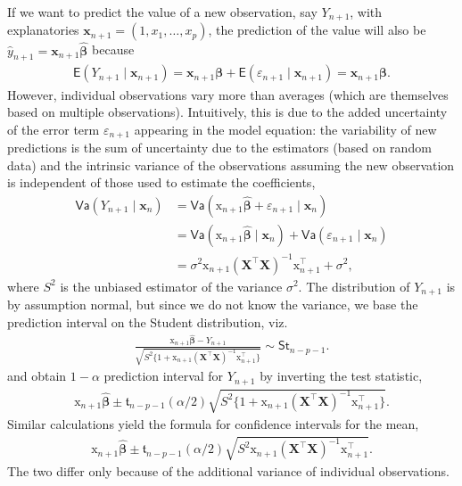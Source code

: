 \documentclass[
  11pt,
  letterpaper,
]{book}
\theoremstyle{definition}
\theoremstyle{definition}
\theoremstyle{definition}
\theoremstyle{definition}
\theoremstyle{remark}
\begin{document}
If we want to predict the value of a new observation, say \(Y_{n+1}\), with explanatories \(\mathbf{x}_{n+1} = (1, x_1, \ldots, x_p)\), the prediction of the value will also be \(\widehat{y}_{n+1} = \mathbf{x}_{n+1}\widehat{\boldsymbol{\beta}}\) because
\begin{align*}
\mathsf{E}(Y_{n+1} \mid \mathbf{x}_{n+1}) = \mathbf{x}_{n+1}\boldsymbol{\beta} + \mathsf{E}(\varepsilon_{n+1} \mid \mathbf{x}_{n+1}) = \mathbf{x}_{n+1}\boldsymbol{\beta}.
\end{align*}
However, individual observations vary more than averages (which are themselves based on multiple observations). Intuitively, this is due to the added uncertainty of the error term \(\varepsilon_{n+1}\) appearing in the model equation: the variability of new predictions is the sum of uncertainty due to the estimators (based on random data) and the intrinsic variance of the observations assuming the new observation is independent of those used to estimate the coefficients,
\begin{align*}
\mathsf{Va}(Y_{n+1} \mid \mathbf{x}_n) &= \mathsf{Va}(\mathrm{x}_{n+1}\widehat{\boldsymbol{\beta}} + \varepsilon_{n+1} \mid \mathbf{x}_n)
\\&=\mathsf{Va}(\mathrm{x}_{n+1}\widehat{\boldsymbol{\beta}} \mid \mathbf{x}_n) +\mathsf{Va}(\varepsilon_{n+1} \mid \mathbf{x}_n)
\\& = \sigma^2\mathrm{x}_{n+1}(\mathbf{X}^\top\mathbf{X})^{-1}\mathrm{x}_{n+1}^\top + \sigma^2,
\end{align*}
where \(S^2\) is the unbiased estimator of the variance \(\sigma^2\). The distribution of \(Y_{n+1}\) is by assumption normal, but since we do not know the variance, we base the prediction interval on the Student distribution, viz.
\begin{align*}
\frac{\mathrm{x}_{n+1}\widehat{\boldsymbol{\beta}}-Y_{n+1}}{\sqrt{S^2\{1+\mathrm{x}_{n+1}(\mathbf{X}^\top\mathbf{X})^{-1}\mathrm{x}_{n+1}^\top\}}}\sim \mathsf{St}_{n-p-1}.
\end{align*}
and obtain \(1-\alpha\) prediction interval for \(Y_{n+1}\) by inverting the test statistic,
\begin{align*}
\mathrm{x}_{n+1}\widehat{\boldsymbol{\beta}}\pm \mathfrak{t}_{n-p-1}(\alpha/2)\sqrt{S^2\{1+\mathrm{x}_{n+1}(\mathbf{X}^\top\mathbf{X})^{-1}\mathrm{x}_{n+1}^\top\}}.
\end{align*}
Similar calculations yield the formula for confidence intervals for the mean,
\begin{align*}
\mathrm{x}_{n+1}\widehat{\boldsymbol{\beta}}\pm \mathfrak{t}_{n-p-1}(\alpha/2)\sqrt{S^2\mathrm{x}_{n+1}(\mathbf{X}^\top\mathbf{X})^{-1}\mathrm{x}_{n+1}^\top}.
\end{align*}
The two differ only because of the additional variance of individual observations.
\end{document}

